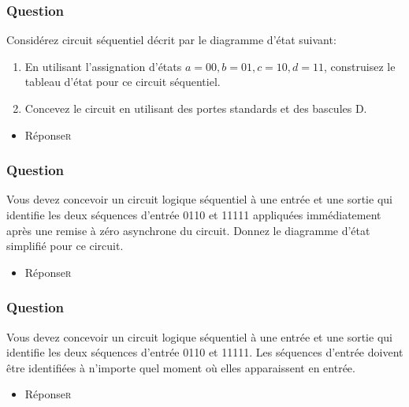 \documentclass[11pt]{article}
\begin{document}
\subsubsection*{Question}
\label{sec:orge2a7266}
Considérez circuit séquentiel décrit par le diagramme d'état suivant:
\begin{center}

\end{center}
\begin{enumerate}
\item En utilisant l'assignation d'états \(a = 00, b = 01, c = 10, d
         = 11\), construisez le tableau d'état pour ce circuit séquentiel.

\item Concevez le circuit en utilisant des portes standards et des
bascules D.
\end{enumerate}

\begin{itemize}
\item Réponse\hfill{}\textsc{r}
\label{sec:org5070a51}
\end{itemize}

\subsubsection*{Question}
\label{sec:org63502d2}
Vous devez concevoir un circuit logique séquentiel à une entrée et
  une sortie qui identifie les deux séquences d'entrée 0110 et 11111
  appliquées immédiatement après une remise à zéro asynchrone du
  circuit. Donnez le diagramme d'état simplifié pour ce circuit.

\begin{itemize}
\item Réponse\hfill{}\textsc{r}
\label{sec:orgaaed3ec}
\end{itemize}

\subsubsection*{Question}
\label{sec:orgfaaa92b}
Vous devez concevoir un circuit logique séquentiel à une entrée et
 une sortie qui identifie les deux séquences d'entrée 0110
 et 11111. Les séquences d'entrée doivent être identifiées à
 n'importe quel moment où elles apparaissent en entrée.

\begin{itemize}
\item Réponse\hfill{}\textsc{r}
\label{sec:orga9f0f04}
\end{itemize}
\end{document}
